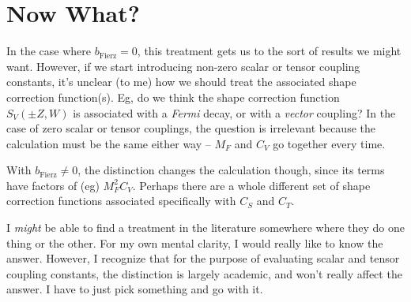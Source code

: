 \section[Now What?]{Now What?}

In the case where $b_{\mathrm{Fierz}} = 0$, this treatment gets us to the sort of results we might want.  However, if we start introducing non-zero scalar or tensor coupling constants, it's unclear (to me) how we should treat the associated shape correction function(s).  Eg, do we think the shape correction function $S_{V}(\pm Z, W)$ is associated with a \emph{Fermi} decay, or with a \emph{vector} coupling?  In the case of %
zero scalar or tensor couplings, the question is irrelevant because the calculation must be the same either way -- $M_F$ and $C_V$ go together every time. 

With $b_{\mathrm{Fierz}} \neq 0$, the distinction changes the calculation though, since its terms have factors of (eg) $M_F^2 C_V$.
Perhaps there are a whole different set of shape correction functions associated specifically with $C_S$ and $C_T$.  

I \emph{might} be able to find a treatment in the literature somewhere where they do one thing or the other.  For my own mental clarity, I would really like to know the answer.  However, I recognize that for the purpose of evaluating scalar and tensor coupling constants, the distinction is largely academic, and won't really affect the answer.  I have to just pick something and go with it.  

